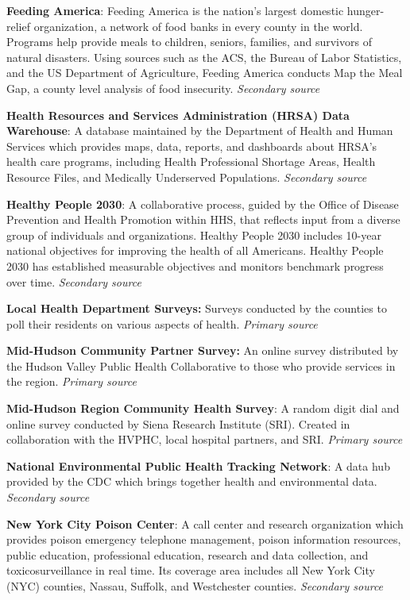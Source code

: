 \documentclass[
  english,
  letterpaper,
]{report}
\begin{document}
\textbf{Feeding America}: Feeding America is the nation's largest
domestic hunger-relief organization, a network of food banks in every
county in the world. Programs help provide meals to children, seniors,
families, and survivors of natural disasters. Using sources such as the
ACS, the Bureau of Labor Statistics, and the US Department of
Agriculture, Feeding America conducts Map the Meal Gap, a county level
analysis of food insecurity. \emph{Secondary source}

\textbf{Health Resources and Services Administration (HRSA) Data
Warehouse}: A database maintained by the Department of Health and Human
Services which provides maps, data, reports, and dashboards about HRSA's
health care programs, including Health Professional Shortage Areas,
Health Resource Files, and Medically Underserved Populations.
\emph{Secondary source}

\textbf{Healthy People 2030}: A collaborative process, guided by the
Office of Disease Prevention and Health Promotion within HHS, that
reflects input from a diverse group of individuals and organizations.
Healthy People 2030 includes 10-year national objectives for improving
the health of all Americans. Healthy People 2030 has established
measurable objectives and monitors benchmark progress over time.
\emph{Secondary source}

\textbf{Local Health Department Surveys:} Surveys conducted by the
counties to poll their residents on various aspects of health.
\emph{Primary source}

\textbf{Mid-Hudson Community Partner Survey:} An online survey
distributed by the Hudson Valley Public Health Collaborative to those
who provide services in the region. \emph{Primary source}

\textbf{Mid-Hudson Region Community Health Survey}: A random digit dial
and online survey conducted by Siena Research Institute (SRI). Created
in collaboration with the HVPHC, local hospital partners, and SRI.
\emph{Primary source}

\textbf{National Environmental Public Health Tracking Network}: A data
hub provided by the CDC which brings together health and environmental
data. \emph{Secondary source}

\textbf{New York City Poison Center}: A call center and research
organization which provides poison emergency telephone management,
poison information resources, public education, professional education,
research and data collection, and toxicosurveillance in real time. Its
coverage area includes all New York City (NYC) counties, Nassau,
Suffolk, and Westchester counties. \emph{Secondary source}
\end{document}
